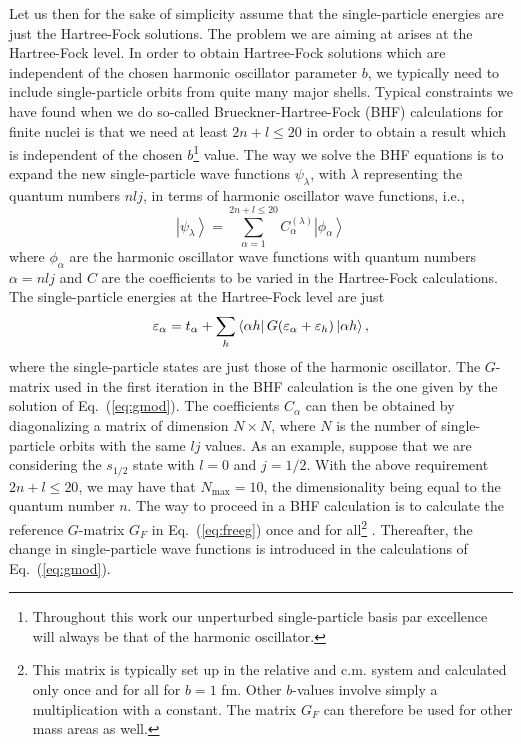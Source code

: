 Let us then for the sake of simplicity assume that the 
single-particle energies are just the Hartree-Fock
solutions. The problem we are aiming at arises at the 
Hartree-Fock level.
In order to obtain Hartree-Fock solutions which
are independent of the chosen harmonic oscillator
parameter $b$, we typically need to include single-particle
orbits from quite many major shells.
Typical constraints we have found when we do so-called
Brueckner-Hartree-Fock (BHF) calculations for finite nuclei is that
we need at least $2n+l \leq 20$ in order to obtain
a result which is independent of the chosen 
$b$\footnote{Throughout this work our unperturbed single-particle
basis par excellence will always be that of the harmonic
oscillator.} value. The way we solve the  
BHF equations is to expand the new single-particle
wave functions $\psi_{\lambda}$, with $\lambda$ 
representing the quantum numbers $nlj$,
in terms of harmonic oscillator wave functions,
i.e.,
\begin{equation}
     \left | \psi_{\lambda}\right\rangle=
     \sum_{\alpha =1}^{2n+l\leq 20} 
     C_{\alpha}^{(\lambda )}\left | \phi_{\alpha}\right\rangle
     \label{eq:selfconstbasis}
\end{equation}
where $\phi_{\alpha}$ are the harmonic oscillator wave functions
with quantum numbers $\alpha=nlj$ and $C$ are the coefficients
to be varied in the Hartree-Fock calculations.
The single-particle energies at the 
Hartree-Fock level are just
\begin{equation}
  \varepsilon_{\alpha}=t_{\alpha}+
   \sum_h \left\langle \alpha h \right| G(\varepsilon_{\alpha}+
                           \varepsilon_h)
          \left| \alpha h \right\rangle,
\end{equation}
where the single-particle states are just those
of the harmonic oscillator. The $G$-matrix used in the 
first iteration in the BHF calculation is the one given
by the solution of Eq.\ (\ref{eq:gmod}).
The coefficients 
$C_{\alpha}$ can then be obtained by diagonalizing
a matrix of dimension $N\times N$, where $N$ is the number
of single-particle orbits with the same $lj$ values.
As an example, suppose that we are considering the 
$s_{1/2}$ state with $l=0$ and $j=1/2$. With the above
requirement $2n+l\leq 20$, we may have
that $N_{\mathrm{max}}=10$, the dimensionality being equal to 
the quantum number $n$. 
The way to proceed in a BHF calculation is to calculate
the reference $G$-matrix $G_F$ in Eq.\ (\ref{eq:freeg})
once and for all\footnote{This matrix is typically
set up in the relative and c.m. system and calculated
only once and for all 
for $b=1$ fm. Other $b$-values involve simply
a multiplication with a constant. The matrix $G_F$ can therefore
be used for other mass areas as well.} .
Thereafter, the change in single-particle wave functions
is introduced in the calculations of Eq.\ (\ref{eq:gmod}).

